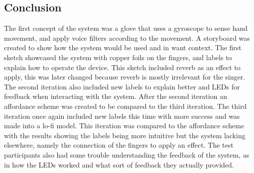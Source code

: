 \subsection{Conclusion}
The first concept of the system was a glove that uses a gyroscope to sense hand movement, and apply voice filters according to the movement. A storyboard was created to show how the system would be used and in want context. The first sketch showcased the system with copper foils on the fingers, and labels to explain how to operate the device. This sketch included reverb as an effect to apply, this was later changed because reverb is mostly irrelevant for the singer. The second iteration also included new labels to explain better and LEDs for feedback when interacting with the system. After the second iteration an affordance scheme was created to be compared to the third iteration. The third iteration once again included new labels this time with more success and was made into a lo-fi model. This iteration was compared to the affordance scheme with the results showing the labels being more intuitive but the system lacking elsewhere, namely the connection of the fingers to apply an effect. The test participants also had some trouble understanding the feedback of the system, as in how the LEDs worked and what sort of feedback they actually provided.
